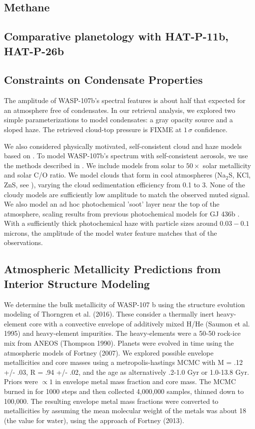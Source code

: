 \documentclass[twocolumn]{aastex61}
\begin{document}
\subsection{Methane}

\subsection{Comparative planetology with HAT-P-11b, HAT-P-26b}

\subsection{Constraints on Condensate Properties}
The amplitude of WASP-107b's spectral features is about half that expected for an atmosphere free of condensates. In our retrieval analysis, we explored two simple parameterizations to model condensates: a gray opacity source and a sloped haze.  The retrieved cloud-top pressure is FIXME at $1\,\sigma$ confidence.

We also considered physically motivated, self-consistent cloud and haze models based on .  To model WASP-107b's spectrum with self-consistent aerosols, we use the methods described in \citep{fortney08, morley15}. We include models from solar to $50\times$ solar metallicity and solar C/O ratio. We model clouds that form in cool atmospheres (Na$_2$S, KCl, ZnS, see \citealt{morley12}), varying the cloud sedimentation efficiency from 0.1 to 3. None of the cloudy models are sufficiently low amplitude to match the observed muted signal. We also model an ad hoc photochemical 'soot' layer near the top of the atmosphere, scaling results from previous photochemical models for GJ 436b \citep{line11, morley17}. With a sufficiently thick photochemical haze with particle sizes around $0.03-0.1$ microns, the amplitude of the model water feature matches that of the observations. 



\subsection{Atmospheric Metallicity Predictions from Interior Structure Modeling}
 We determine the bulk metallicity of WASP-107 b using the structure evolution modeling of Thorngren et al. (2016).  These consider a thermally inert heavy-element core with a convective envelope of additively mixed H/He (Saumon et al. 1995) and heavy-element impurities.  The heavy-elements were a 50-50 rock-ice mix from ANEOS (Thompson 1990).  Planets were evolved in time using the atmospheric models of Fortney (2007).  We explored possible envelope metallicities and core masses using a metropolis-hastings MCMC with M = .12 +/- .03, R = .94 +/- .02, and the age as alternatively .2-1.0 Gyr or 1.0-13.8 Gyr.  Priors were $\propto 1$ in envelope metal mass fraction and core mass.  The MCMC burned in for 1000 steps and then collected 4,000,000 samples, thinned down to 100,000.  The resulting envelope metal mass fractions were converted to metallicities by assuming the mean molecular weight of the metals was about 18 (the value for water), using the approach of Fortney (2013).
\end{document}
